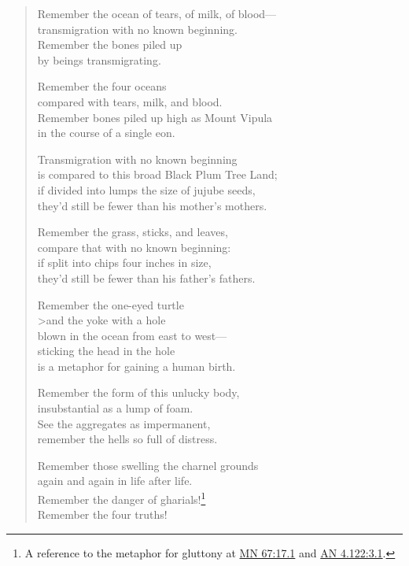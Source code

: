 \documentclass[12pt,openany]{book}%
\begin{document}
\begin{verse}
Remember the ocean of tears, of milk, of blood—\\
transmigration with no known beginning. \\
Remember the bones piled up \\
by beings transmigrating. 

Remember the four oceans \\
compared with tears, milk, and blood. \\
Remember bones piled up high as Mount Vipula \\
in the course of a single eon. 

Transmigration with no known beginning \\
is compared to this broad Black Plum Tree Land; \\
if divided into lumps the size of jujube seeds, \\
they’d still be fewer than his mother’s mothers. 

Remember the grass, sticks, and leaves, \\
compare that with no known beginning: \\
if split into chips four inches in size, \\
they’d still be fewer than his father’s fathers. 

Remember the one-eyed turtle \\>and the yoke with a hole \\
blown in the ocean from east to west—\\
sticking the head in the hole \\
is a metaphor for gaining a human birth. 

Remember the form of this unlucky body, \\
insubstantial as a lump of foam. \\
See the aggregates as impermanent, \\
remember the hells so full of distress. 

Remember those swelling the charnel grounds \\
again and again in life after life. \\
Remember the danger of gharials!\footnote{A reference to the metaphor for gluttony at \href{https://suttacentral.net/mn67/en/sujato\#17.1}{MN 67:17.1} and \href{https://suttacentral.net/an4.122/en/sujato\#3.1}{AN 4.122:3.1}. } \\
Remember the four truths! 


\end{verse}
\end{document}
